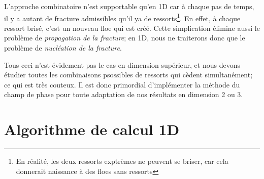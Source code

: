 L'approche combinatoire n'est supportable qu'en 1D car à chaque pas de temps, il y a autant de fracture admissibles qu'il ya de ressorts\footnote{En réalité, les deux ressorts exptrèmes ne peuvent se briser, car cela donnerait naissance à des floes sans ressorts}. En effet, à chaque ressort brisé, c'est un nouveau floe qui est créé. Cette simplication élimine aussi le problème de \emph{propagation de la fracture}; en 1D, nous ne traiterons donc que le problème de \emph{nucléation de la fracture}. 

Tous ceci n'est évidement pas le cas en dimension supérieur, et nous devons étudier toutes les combinaisons psossibles de ressorts qui cèdent simultanément; ce qui est très couteux. Il est donc primordial d'implémenter la méthode du champ de phase pour toute adaptation de nos résultats en dimension 2 ou 3.







\section{Algorithme de calcul 1D}


